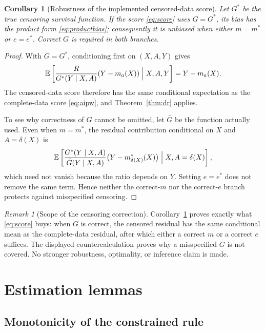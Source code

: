 \documentclass[11pt,a4paper]{article}
\theoremstyle{plain}
\newtheorem{corollary}[theorem]{Corollary}
\theoremstyle{definition}
\theoremstyle{remark}
\newtheorem*{remark*}{Remark}
\newcommand{\E}{\mathbb E}
\begin{document}
\begin{corollary}[Robustness of the implemented censored-data score]
\label{cor:censored-dr}
Let $G^\ast$ be the true censoring survival function. If the score
\eqref{eq:score} uses $G=G^\ast$, its bias has the product form
\eqref{eq:productbias}; consequently it is unbiased when either $m=m^\ast$ or
$e=e^\ast$. Correct $G$ is required in both branches.
\end{corollary}

\begin{proof}
With $G=G^\ast$, conditioning first on $(X,A,Y)$ gives
\[
\E\left[\frac{R}{G^\ast(Y\mid X,A)}(Y-m_a(X))\Bigm|X,A,Y\right]
=Y-m_a(X).
\]
The censored-data score therefore has the same conditional expectation as the
complete-data score \eqref{eq:aipw}, and Theorem~\ref{thm:dr} applies.

To see why correctness of $G$ cannot be omitted, let $\bar G$ be the function
actually used. Even when $m=m^\ast$, the residual contribution conditional on
$X$ and $A=\delta(X)$ is
\[
\E\left[
\frac{G^\ast(Y\mid X,A)}{\bar G(Y\mid X,A)}
\bigl(Y-m^\ast_{\delta(X)}(X)\bigr)
\Bigm|X,A=\delta(X)\right],
\]
which need not vanish because the ratio depends on $Y$. Setting $e=e^\ast$
does not remove the same term. Hence neither the correct-$m$ nor the correct-$e$
branch protects against misspecified censoring.
\end{proof}

\begin{remark*}[Scope of the censoring correction]
Corollary~\ref{cor:censored-dr} proves exactly what \eqref{eq:score} buys: when $G$ is correct,
the censored residual has the same conditional mean as the complete-data residual, after which
either a correct $m$ or a correct $e$ suffices. The displayed countercalculation proves why a
misspecified $G$ is not covered. No stronger robustness, optimality, or inference claim is made.
\end{remark*}

\section{Estimation lemmas}\label{app:estlemmas}

\subsection{Monotonicity of the constrained rule}\label{app:mono}
\end{document}
